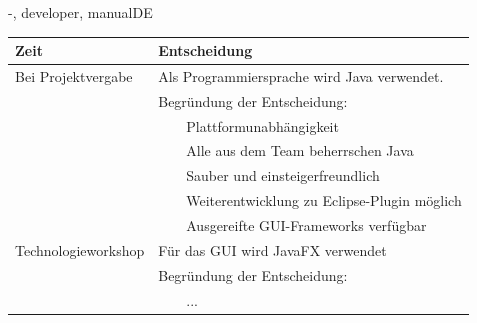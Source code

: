 \documentclass[twoside]{report}
\newcommand{\tabitem}{~~\llap{\textbullet}~~}
\begin{document}
\begin{shownto}{-, developer, manualDE}

\begin{table}[h]
\centering
\begin{tabular}{|l|l|}
\toprule
Zeit & Entscheidung \\
\midrule
Bei Projektvergabe & Als Programmiersprache wird Java verwendet.\\
& Begründung der Entscheidung:\\
&      \tabitem Plattformunabhängigkeit\\
&      \tabitem Alle aus dem Team beherrschen Java\\
&      \tabitem Sauber und einsteigerfreundlich\\
&      \tabitem Weiterentwicklung zu Eclipse-Plugin möglich\\
&      \tabitem Ausgereifte GUI-Frameworks verfügbar\\
\midrule
Technologieworkshop & Für das GUI wird JavaFX verwendet\\
& Begründung der Entscheidung:\\
&      \tabitem ...\\
\bottomrule
\end{tabular}
\end{table}
\nsecend


\nsecend %

\end{shownto} %
\end{document}
